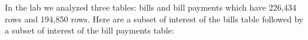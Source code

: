 \documentclass[12pt]{article}
\begin{document}
%
%
%
%
%
%
%
%


\problem In the lab we analyzed three tables: bills and bill payments which have 226,434 rows and 194,850 rows. Here are a subset of interest of the bills table followed by a subset of interest of the bill payments table: \pagebreak
\end{document}
